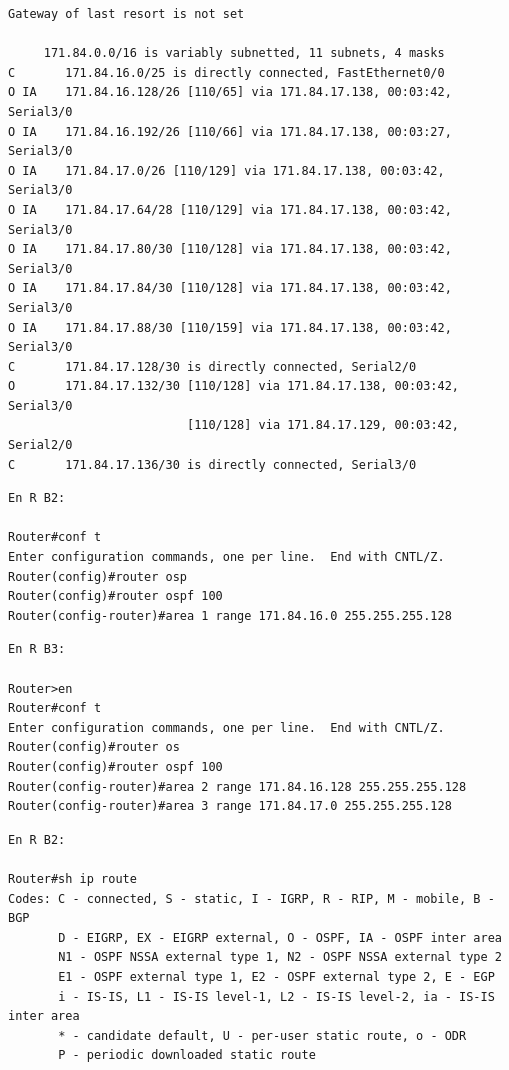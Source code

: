 \documentclass[11pt]{article}
\begin{document}
\begin{enumerate}
\begin{mdframed}
\begin{verbatim}
Gateway of last resort is not set

     171.84.0.0/16 is variably subnetted, 11 subnets, 4 masks
C       171.84.16.0/25 is directly connected, FastEthernet0/0
O IA    171.84.16.128/26 [110/65] via 171.84.17.138, 00:03:42, Serial3/0
O IA    171.84.16.192/26 [110/66] via 171.84.17.138, 00:03:27, Serial3/0
O IA    171.84.17.0/26 [110/129] via 171.84.17.138, 00:03:42, Serial3/0
O IA    171.84.17.64/28 [110/129] via 171.84.17.138, 00:03:42, Serial3/0
O IA    171.84.17.80/30 [110/128] via 171.84.17.138, 00:03:42, Serial3/0
O IA    171.84.17.84/30 [110/128] via 171.84.17.138, 00:03:42, Serial3/0
O IA    171.84.17.88/30 [110/159] via 171.84.17.138, 00:03:42, Serial3/0
C       171.84.17.128/30 is directly connected, Serial2/0
O       171.84.17.132/30 [110/128] via 171.84.17.138, 00:03:42, Serial3/0
                         [110/128] via 171.84.17.129, 00:03:42, Serial2/0
C       171.84.17.136/30 is directly connected, Serial3/0
\end{verbatim}
\end{mdframed}

\begin{mdframed}
\begin{verbatim}
En R B2:

Router#conf t
Enter configuration commands, one per line.  End with CNTL/Z.
Router(config)#router osp
Router(config)#router ospf 100
Router(config-router)#area 1 range 171.84.16.0 255.255.255.128
\end{verbatim}
\end{mdframed}

\begin{mdframed}
\begin{verbatim}
En R B3:

Router>en
Router#conf t
Enter configuration commands, one per line.  End with CNTL/Z.
Router(config)#router os
Router(config)#router ospf 100
Router(config-router)#area 2 range 171.84.16.128 255.255.255.128
Router(config-router)#area 3 range 171.84.17.0 255.255.255.128
\end{verbatim}
\end{mdframed}

\begin{mdframed}
\begin{verbatim}
En R B2:

Router#sh ip route
Codes: C - connected, S - static, I - IGRP, R - RIP, M - mobile, B - BGP
       D - EIGRP, EX - EIGRP external, O - OSPF, IA - OSPF inter area
       N1 - OSPF NSSA external type 1, N2 - OSPF NSSA external type 2
       E1 - OSPF external type 1, E2 - OSPF external type 2, E - EGP
       i - IS-IS, L1 - IS-IS level-1, L2 - IS-IS level-2, ia - IS-IS inter area
       * - candidate default, U - per-user static route, o - ODR
       P - periodic downloaded static route


\end{verbatim}
\end{mdframed}
\end{enumerate}
\end{document}
